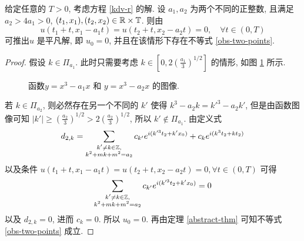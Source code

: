 \begin{theorem}\label{a24a1}
给定任意的 $T>0$, 考虑方程 \eqref{kdv-r} 的解. 设 $a_1,a_2$ 为两个不同的正整数, 且满足 $a_2>4a_1>0$, $(t_1,x_1), (t_2,x_2)\in \mathbb{R}\times \mathbb{T}$. 则由 
  \begin{equation*}
        u(t_1+t,x_1-a_1t)=u(t_2+t,x_2-a_2t)=0,\quad \forall t\in (0,T)
  \end{equation*}
可推出$u$ 是平凡解, 即 $u_0=0$, 并且在该情形下存在不等式 \eqref{obs-two-points}.
    \end{theorem}
    \begin{proof}
假设 $k\in  \Pi_{a_1}$. 此时只需要考虑 $k\in \left[0, 2\left(\frac{a_1}{3}\right)^{1 /2}\right]$ 的情形, 如图 \ref{fig6} 所示.
          \begin{figure}[htbp]
        \centering
        \caption{函数$y=x^3-a_1x$ 和 $y=x^3-a_2 x$ 的图像.}
        \label{fig6}
    \end{figure}
     若 $k\in \Pi_{a_2} $, 则必然存在另一个不同的 $k'$ 使得 $k^3-a_2k={k'}^3-a_2k'$, 但是由函数图像可知 $|k'|\ge\left(\frac{a_2}{3}\right)^{1 /2}>2\left(\frac{a_2}{3}\right)^{1 /2}$, 所以 $k'\notin \Pi_{a_1}$. 由定义式
     \begin{equation*}
         d_{2,k}=\sum\limits_{\substack{k'\neq k\in \mathbb{Z},\\ k^2+mk+m^2=a_2}} c_{k'}e^{i(k'^3t_2+k'x_0)}+c_k e^{i(k^3t_2+kt_2)}
     \end{equation*}
     以及条件 $u(t_1+t,x_1-a_1t)=u(t_2+t,x_2-a_2t)=0,\forall t\in (0,T)$ 可得 $$\sum\limits_{\substack{k'\neq k\in \mathbb{Z},\\ k^2+mk+m^2=a_2}} c_{k'}e^{i(k'^3t_2+k'x_0)}=0$$ 以及 $d_{2,k}=0$, 进而 $c_k=0$. 所以 $u_0=0$. 再由定理 \ref{abstract-thm} 可知不等式 \eqref{obs-two-points} 成立.
      \end{proof}
